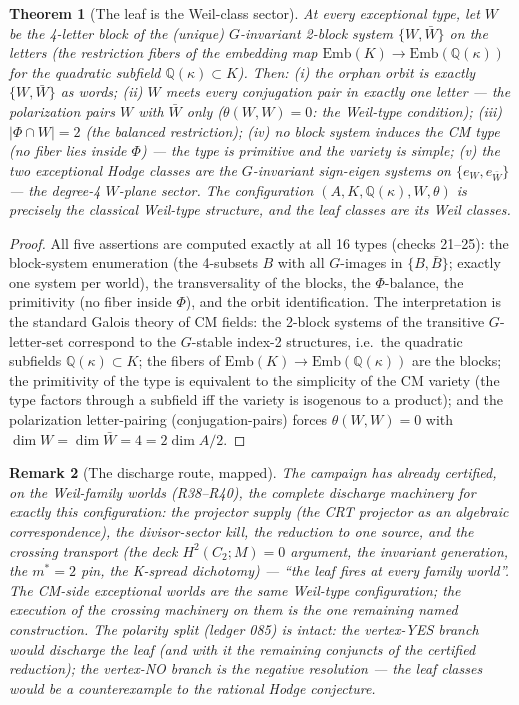 \documentclass[11pt]{article}
\newtheorem{theorem}{Theorem}
\newtheorem{remark}[theorem]{Remark}
\begin{document}
\begin{theorem}[The leaf is the Weil-class sector]\label{thm:weil}
At every exceptional type, let $W$ be the 4-letter block of the (unique) $G$-invariant 2-block
system $\{W, \bar W\}$ on the letters (the restriction fibers of the embedding map
$\mathrm{Emb}(K) \to \mathrm{Emb}(\mathbb{Q}(\kappa))$ for the quadratic subfield
$\mathbb{Q}(\kappa) \subset K$).  Then:
(i) the orphan orbit is exactly $\{W, \bar W\}$ as words;
(ii) $W$ meets every conjugation pair in exactly one letter --- the polarization pairs $W$ with
$\bar W$ only ($\theta(W, W) = 0$: the Weil-type condition);
(iii) $|\Phi \cap W| = 2$ (the balanced restriction);
(iv) no block system induces the CM type (no fiber lies inside $\Phi$) --- the type is
primitive and the variety is simple;
(v) the two exceptional Hodge classes are the $G$-invariant sign-eigen systems on
$\{e_W, e_{\bar W}\}$ --- the degree-4 $W$-plane sector.
The configuration $(A, K, \mathbb{Q}(\kappa), W, \theta)$ is precisely the classical
\emph{Weil-type} structure, and the leaf classes are its Weil classes.
\end{theorem}

\begin{proof}
All five assertions are computed exactly at all 16 types (checks 21--25): the block-system
enumeration (the 4-subsets $B$ with all $G$-images in $\{B, \bar B\}$; exactly one system per
world), the transversality of the blocks, the $\Phi$-balance, the primitivity (no fiber inside
$\Phi$), and the orbit identification.  The interpretation is the standard Galois theory of
CM fields: the 2-block systems of the transitive $G$-letter-set correspond to the $G$-stable
index-2 structures, i.e.\ the quadratic subfields $\mathbb{Q}(\kappa) \subset K$; the fibers of
$\mathrm{Emb}(K) \to \mathrm{Emb}(\mathbb{Q}(\kappa))$ are the blocks; the primitivity of the
type is equivalent to the simplicity of the CM variety (the type factors through a subfield iff
the variety is isogenous to a product); and the polarization letter-pairing
(conjugation-pairs) forces $\theta(W, W) = 0$ with $\dim W = \dim \bar W = 4 = 2\dim A/2$.
\end{proof}

\begin{remark}[The discharge route, mapped]
The campaign has already certified, on the Weil-family worlds (R38--R40), the complete discharge
machinery for exactly this configuration: the projector supply (the CRT projector as an
algebraic correspondence), the divisor-sector kill, the reduction to one source, and the
crossing transport (the deck $H^2(C_2; M) = 0$ argument, the invariant generation, the
$m^* = 2$ pin, the K-spread dichotomy) --- ``the leaf fires at every family world''.  The
CM-side exceptional worlds are the same Weil-type configuration; the execution of the crossing
machinery on them is the one remaining named construction.  The polarity split (ledger 085)
is intact: the vertex-YES branch would discharge the leaf (and with it the remaining conjuncts
of the certified reduction); the vertex-NO branch is the negative resolution --- the leaf
classes would be a counterexample to the rational Hodge conjecture.
\end{remark}
\end{document}
